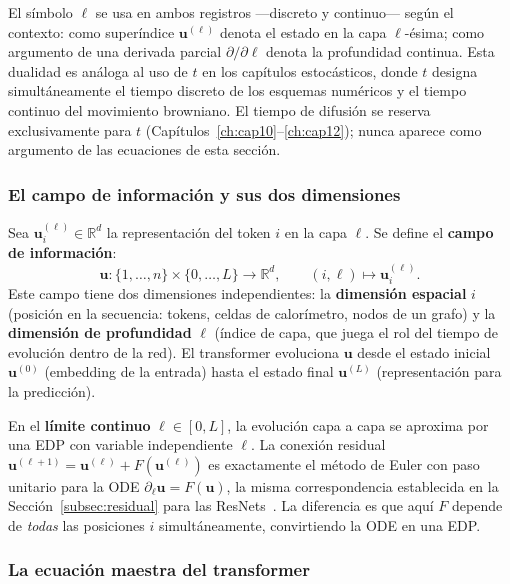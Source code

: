 El símbolo $\ell$ se usa en ambos registros —discreto y continuo—
según el contexto: como superíndice $\bm{u}^{(\ell)}$ denota el
estado en la capa $\ell$-ésima; como argumento de una derivada
parcial $\partial/\partial\ell$ denota la profundidad continua.
Esta dualidad es análoga al uso de $t$ en los capítulos
estocásticos, donde $t$ designa simultáneamente el tiempo discreto
de los esquemas numéricos y el tiempo continuo del movimiento
browniano. El tiempo de difusión se reserva exclusivamente para
$t$ (Capítulos~\ref{ch:cap10}--\ref{ch:cap12}); nunca aparece como
argumento de las ecuaciones de esta sección.

\subsubsection*{El campo de información y sus dos dimensiones}

Sea $\bm{u}_i^{(\ell)} \in \mathbb{R}^d$ la representación del
token $i$ en la capa $\ell$. Se define el \textbf{campo de
información}:
\begin{equation}
  \bm{u}: \{1,\ldots,n\} \times \{0,\ldots,L\} \to \mathbb{R}^d,
  \qquad (i, \ell) \mapsto \bm{u}_i^{(\ell)}.
  \label{eq:campo_info}
\end{equation}
Este campo tiene dos dimensiones independientes: la
\textbf{dimensión espacial} $i$ (posición en la secuencia: tokens,
celdas de calorímetro, nodos de un grafo) y la \textbf{dimensión
de profundidad} $\ell$ (índice de capa, que juega el rol del tiempo
de evolución dentro de la red). El transformer evoluciona $\bm{u}$
desde el estado inicial $\bm{u}^{(0)}$ (embedding de la entrada)
hasta el estado final $\bm{u}^{(L)}$ (representación para la
predicción).

En el \textbf{límite continuo} $\ell \in [0,L]$, la evolución capa
a capa se aproxima por una EDP con variable independiente $\ell$.
La conexión residual
$\bm{u}^{(\ell+1)} = \bm{u}^{(\ell)} + F(\bm{u}^{(\ell)})$ es
exactamente el método de Euler con paso unitario para la ODE
$\partial_\ell\bm{u} = F(\bm{u})$, la misma correspondencia
establecida en la Sección~\ref{subsec:residual} para las
ResNets~\cite{chen2018neural}. La diferencia es que aquí $F$ depende
de \emph{todas} las posiciones $i$ simultáneamente, convirtiendo la
ODE en una EDP.

\subsubsection*{La ecuación maestra del transformer}

